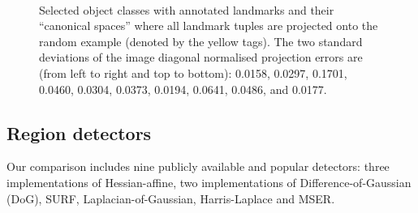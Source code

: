 \documentclass[preprint,authoryear,review]{elsarticle}
\begin{document}
\begin{figure}[h]
\begin{center}
~
\caption{Selected object classes with annotated landmarks and their ``canonical spaces'' where all landmark tuples are projected onto the random example (denoted by the yellow tags). The two standard deviations of the image diagonal normalised projection errors are (from left to right and top to bottom):
0.0158,
0.0297,
0.1701,
0.0460,
0.0304,
0.0373,
0.0194,
0.0641,
0.0486, and
0.0177.\label{fig:affine_example1}}
\end{center}
\end{figure}

%
\subsection{Region detectors}
%
Our comparison includes nine publicly available and popular detectors: 
three implementations of Hessian-affine, two implementations of Difference-of-Gaussian (DoG),
SURF, Laplacian-of-Gaussian, Harris-Laplace and MSER. %
\end{document}
